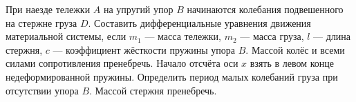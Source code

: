 При наезде тележки $A$ на упругий упор $B$ начинаются колебания
подвешенного на стержне груза $D$.
Составить дифференциальные уравнения движения материальной системы,
если $m_1$ --- масса тележки, $m_2$ --- масса груза, $l$ --- длина стержня,
$c$ --- коэффициент жёсткости пружины упора $B$.
Массой колёс и всеми силами сопротивления пренебречь.
Начало отсчёта оси $x$ взять в левом конце недеформированной пружины.
Определить период малых колебаний груза при отсутствии упора $B$.
Массой стержня пренебречь.
